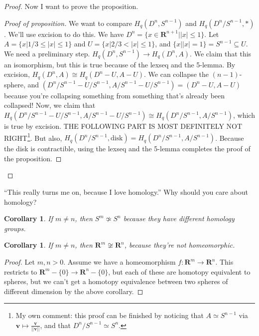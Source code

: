 \documentclass{amsart}
\theoremstyle{theorem}
\newtheorem{corollary}[theorem]{Corollary}
\theoremstyle{definition}
\begin{document}
\begin{proof}
Now I want to prove the proposition. 
\begin{proof}[Proof of proposition]
We want to compare $ H_q(D^n,S^{n-1})$ and $ H_q(D^n/S^{n-1},\ast)$. We'll use excision to do this. We have $D^n=\{ x\in\mathbf{R}^{n+1} | |x|\leq 1 \}$. Let $A=\{ x|1/3\leq |x|\leq 1 \}$ and $U=\{ x|2/3<|x|\leq 1 \}$, and $\{ x||x|=1 \} =S^{n-1}\subseteq U$. We need a preliminary step. $ H_q(D^n,S^{n-1})\to H_q(D^n,A)$. We claim that this an isomorphism, but this is true because of the lexseq and the 5-lemma. By excision, $ H_q(D^n,A)\cong H_q(D^n-U,A-U)$. We can collapse the $(n-1)$-sphere, and $(D^n/S^{n-1}-U/S^{n-1},A/S^{n-1}-U/S^{n-1})=(D^n-U,A-U)$ because you're collapsing something from something that's already been collapsed! Now, we claim that $ H_q(D^n/S^{n-1}-U/S^{n-1},A/S^{n-1}-U/S^{n-1})\cong H_q(D^n/S^{n-1},A/S^{n-1})$, which is true by excision. THE FOLLOWING PART IS MOST DEFINITELY NOT RIGHT\footnote{My own comment: this proof can be finished by noticing that $A\simeq S^{n-1}$ via $\mathbf{v}\mapsto\frac{\mathbf{v}}{||\mathbf{v}||}$, and that $D^n/S^{n-1}\simeq S^n$.}. But also, $ H_q(D^n/S^{n-1},\text{disk})= H_q(D^n/S^{n-1},A/S^{n-1})$. Because the disk is contractible, using the lexseq and the 5-lemma completes the proof of the proposition.
\end{proof}
\end{proof}
``This really turns me on, because I love homology.'' Why should you care about homology?
\begin{corollary}
If $m\neq n$, then $S^m\not\simeq S^n$ because they have different homology groups. 
\end{corollary}
\begin{corollary}
If $m\neq n$, then $\mathbf{R}^m\not\cong \mathbf{R}^n$, because they're not homeomorphic.
\end{corollary}
\begin{proof}
Let $m,n>0$. Assume we have a homeomorphism $f:\mathbf{R}^m\to \mathbf{R}^n$. This restricts to $\mathbf{R}^m-\{0\}\to \mathbf{R}^n-\{0\}$, but each of these are homotopy equivalent to spheres, but we can't get a homotopy equivalence between two spheres of different dimension by the above corollary.
\end{proof}
\end{document}
